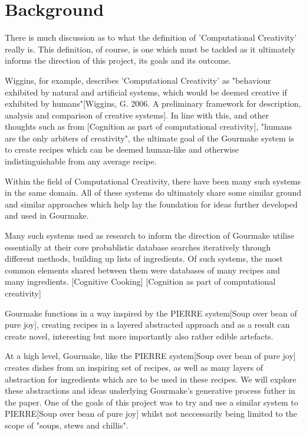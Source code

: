\documentclass[9pt,titlepage,a4paper]{extarticle}
\begin{document}
\section{Background}
    There is much discussion as to what the definition of 'Computational Creativity' really is. This definition,
    of course, is one which must be tackled as it ultimately informs the direction of this project, its goals and
    its outcome. 

    Wiggins, for example, describes 'Computational Creativity' as "behaviour exhibited by natural and artificial
    systems, which would be deemed creative if exhibited by humans"[Wiggins, G. 2006. A preliminary framework for description,
    analysis and comparison of creative systems]. In line with this, and other thoughts such
    as from [Cognition as part of computational creativity], "humans are the only arbiters of creativity", the ultimate goal of the Gourmake system is to
    create recipes which can be deemed human-like and otherwise indistinguishable from any average recipe.

    Within the field of Computational Creativity, there have been many such systems in the same domain. 
    All of these systems do ultimately share some similar ground and similar approaches which help lay the
    foundation for ideas further developed and used in Gourmake.

    Many such systems used as research to inform the direction of Gourmake utilise essentially at their core
    probablistic database searches iteratively through different methods, building up lists of ingredients. Of such
    systems, the most common elements shared between them were databases of many recipes and many ingredients. [Cognitive Cooking]
    [Cognition as part of computational creativity]

    Gourmake functions in a way inspired by the PIERRE system[Soup over bean of pure joy], creating recipes in a layered
    abstracted approach and as a result can create novel, interesting but more importantly also
    rather edible artefacts. 

    At a high level, Gourmake, like the PIERRE system[Soup over bean of pure joy] creates dishes from an inspiring set of recipes,
    as well as many layers of abstraction for ingredients which are to be used in these recipes. We will
    explore these abstractions and ideas underlying Gourmake's generative process futher in the paper. One of the
    goals of this project was to try and use a similar system to PIERRE[Soup over bean of pure joy] whilst not neccessarily being
    limited to the scope of "soups, stews and chillis".
\end{document}
